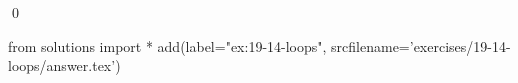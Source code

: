 
\begin{ex}
  \label{ex:19-14-loops}
  
  \qed
\end{ex}
\begin{python0}
from solutions import *
add(label="ex:19-14-loops",
    srcfilename='exercises/19-14-loops/answer.tex')
\end{python0}
